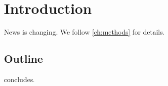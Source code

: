 \chapter{Introduction}
\label{ch:intro}

News is changing.
We follow \cref{ch:methods} for details.

\section{Outline}

 concludes.
